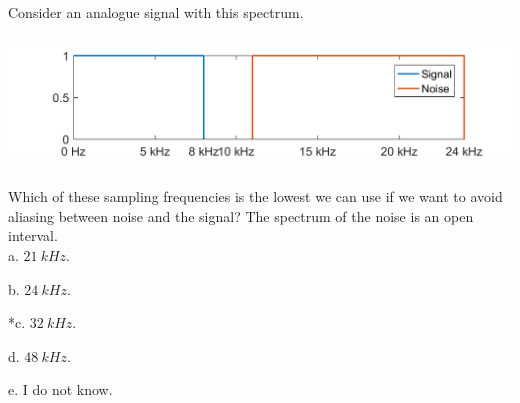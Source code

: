 
Consider an analogue signal with this spectrum.

\includegraphics[width=6.27083in,height=1.375in]{../../Images/SamplingAndAliasingQ6.png}

Which of these sampling frequencies is the lowest we can use if we want to avoid aliasing between noise and the signal? The spectrum of the noise is an open interval. \\

a. \(21\ kHz\).


b. \(24\ kHz\).


*c. \(32\ kHz\).


d. \(48\ kHz\).


e. I do not know. \\

